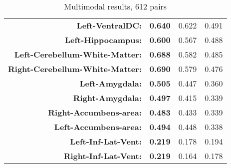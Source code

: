 \begin{table}[htbp]
{\begin{tabular}{rrrr}
    \textbf{Left-VentralDC:} & \textbf{0.640} & 0.622 & 0.491 \\
    \textbf{Left-Hippocampus:} & \textbf{0.600} & 0.567 & 0.488 \\
    \textbf{Left-Cerebellum-White-Matter:} & \textbf{0.688} & 0.582 & 0.485 \\
    \textbf{Right-Cerebellum-White-Matter:} & \textbf{0.690} & 0.579 & 0.476 \\
    \textbf{Left-Amygdala:} & \textbf{0.505} & 0.447 & 0.360 \\
    \textbf{Right-Amygdala:} & \textbf{0.497} & 0.415 & 0.339 \\
    \textbf{Right-Accumbens-area:} & \textbf{0.483} & 0.433 & 0.339 \\
    \textbf{Left-Accumbens-area:} & \textbf{0.494} & 0.448 & 0.338 \\
    \textbf{Left-Inf-Lat-Vent:} & \textbf{0.219} & 0.178 & 0.194 \\
    \textbf{Right-Inf-Lat-Vent:} & \textbf{0.219} & 0.164 & 0.178 \\
    \bottomrule
    \end{tabular}}%
    \caption{Multimodal results, 612 pairs}
  \label{tab:addlabel}%
\end{table}%
